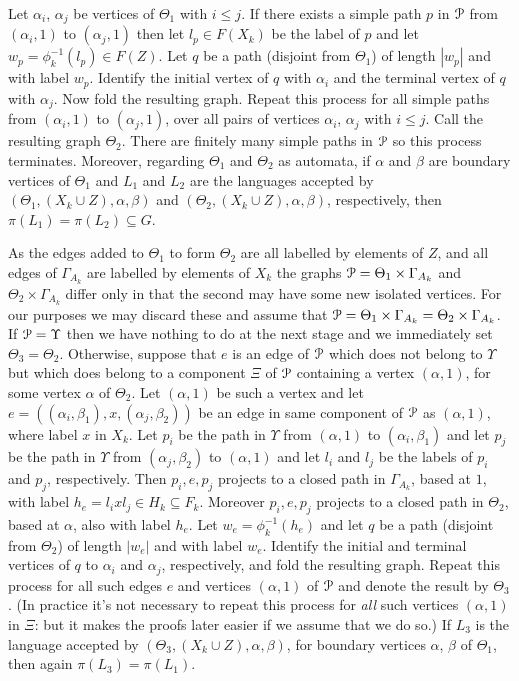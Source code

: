 \documentclass[a4paper,12pt]{article}
\renewcommand{\a}{\alpha }
\renewcommand{\b}{\beta }
\newcommand{\G}{\Gamma }
\newcommand{\T}{\Theta }
\newcommand{\U}{\Upsilon }
\newcommand{\cP}{{\cal{P}}}
\numberwithin{equation}{section}
\numberwithin{figure}{section}
\begin{document}
Let $\a_i$, $\a_j$ be vertices of  $\T_1$ with $i\le j$. If there
exists a simple path $p$ in $\cP$ from $(\a_i,1)$ to $(\a_j,1)$
then let $l_p\in F(X_k)$ be the label of $p$ and let
$w_p=\phi_k^{-1}(l_p)\in F(Z)$. Let $q$ be a path (disjoint from
$\T_1$) of length $|w_p|$ and with label $w_p$. Identify the
initial vertex of $q$ with $\a_i$ and the terminal vertex of $q$
with $\a_j$. Now fold the resulting graph. Repeat this process for
all simple paths from  $(\a_i,1)$ to $(\a_j,1)$, over all pairs of
vertices $\a_i$, $\a_j$ with $i\le j$. Call the resulting graph
$\T_2$. There are finitely many simple paths in $\cP$ so this
process terminates. Moreover, regarding $\T_1$ and $\T_2$ as
automata, if $\a$ and
 $\b$ are
boundary vertices of $\T_1$ and $L_1$ and $L_2$ are the
languages accepted by $(\T_1,(X_k\cup Z), \a,\b)$ and
$(\T_2,(X_k\cup Z), \a,\b)$, respectively, then $\pi(L_1)=\pi(L_2)\subseteq G$.

As the edges added to $\T_1$ to form $\T_2$ are all labelled by elements
of $Z$, and all edges of $\G_{A_k}$ are labelled by elements of $X_k$
the graphs $\cP=\T_1\times \G_{A_k}$ and $\T_2\times \G_{A_k}$ differ only
in that the second may have some new isolated vertices. For our purposes
we may discard these and assume that $\cP=\T_1\times \G_{A_k}=
 \T_2\times \G_{A_k}$. If $\cP=\U$ then we have nothing to do at the
next stage and we immediately set $\T_3=\T_2$. Otherwise, suppose
that $e$ is an edge of $\cP$ which does not belong to $\U$ but
which does belong to a component $\Xi$  of $\cP$ containing a
vertex $(\a,1)$, for some vertex $\a$ of $\T_2$. Let $(\a,1)$ be
such a vertex and let $e=((\a_i,\b_1), x, (\a_j,\b_2))$ be an edge
in same component of $\cP$ as $(\a,1)$,
 where label $x$ in $X_k$.
 Let $p_i$ be
the path in $\U$ from $(\a,1)$ to $(\a_i,\b_1)$ and let $p_j$ be
the path in $\U$ from  $(\a_j,\b_2)$ to $(\a,1)$ and
let $l_i$ and $l_j$ be the labels of $p_i$ and $p_j$, respectively. Then
$p_i,e,p_j$ projects to a closed path in $\G_{A_k}$, based at $1$, with
label $h_e=l_i x l_j \in H_k\subseteq F_k$. Moreover
$p_i,e,p_j$ projects to a closed path in $\T_2$, based at $\a$, also
with label $h_e$. Let
$w_e=\phi_k^{-1}(h_e)$ and let
$q$ be a path (disjoint from $\T_2$) of length
$|w_e|$ and with label $w_e$. Identify the initial and terminal
vertices of $q$ to $\a_i$ and $\a_j$, respectively, and fold the
resulting graph. Repeat this process for all such edges $e$ and
vertices $(\a,1)$ of $\cP$
and denote the result by $\T_3$.
(In practice it's not necessary to
repeat this process for {\em all} such vertices $(\a,1)$ in $\Xi$: but it
makes the proofs later easier if we assume that we do so.)
If
$L_3$ is the
language accepted by $(\T_3,(X_k\cup Z), \a,\b)$, for boundary
vertices $\a$, $\b$ of $\T_1$, then again $\pi(L_3)=\pi(L_1)$.
\end{document}
